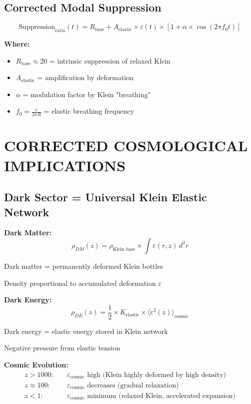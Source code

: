 \documentclass[12pt,a4paper]{article}
\begin{document}
\subsection{Corrected Modal Suppression}

\begin{equation}
\text{Suppression}_{\text{ratio}}(t) = R_{\text{base}} + A_{\text{elastic}} \times \varepsilon(t) \times [1 + \alpha \times \cos(2\pi f_0 t)]
\end{equation}

\textbf{Where:}
\begin{itemize}
\item $R_{\text{base}} \approx 20$ = intrinsic suppression of relaxed Klein
\item $A_{\text{elastic}}$ = amplification by deformation
\item $\alpha$ = modulation factor by Klein "breathing"
\item $f_0 = \frac{c}{2\pi R}$ = elastic breathing frequency
\end{itemize}

\section{CORRECTED COSMOLOGICAL IMPLICATIONS}

\subsection{Dark Sector = Universal Klein Elastic Network}

\textbf{Dark Matter:}
\begin{equation}
\rho_{DM}(z) = \rho_{\text{Klein base}} \times \int \varepsilon(r,z) \, d^3r
\end{equation}

Dark matter = permanently deformed Klein bottles

Density proportional to accumulated deformation $\varepsilon$

\textbf{Dark Energy:}
\begin{equation}
\rho_{DE}(z) = \frac{1}{2} \times K_{\text{elastic}} \times \langle\varepsilon^2(z)\rangle_{\text{cosmic}}
\end{equation}

Dark energy = elastic energy stored in Klein network

Negative pressure from elastic tension

\textbf{Cosmic Evolution:}
\begin{align}
z > 1000: &\quad \varepsilon_{\text{cosmic}} \text{ high (Klein highly deformed by high density)}\\
z \approx 100: &\quad \varepsilon_{\text{cosmic}} \text{ decreases (gradual relaxation)}\\
z < 1: &\quad \varepsilon_{\text{cosmic}} \text{ minimum (relaxed Klein, accelerated expansion)}
\end{align}
\end{document}
